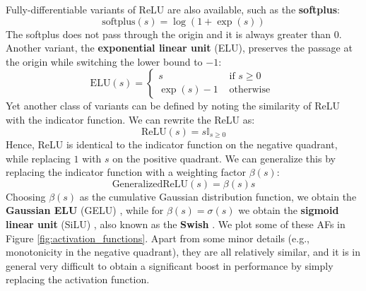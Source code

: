 Fully-differentiable variants of ReLU are also available, such as the \textbf{softplus}:
%
\begin{equation}
\text{softplus}(s)=\log(1+\exp(s))
\label{eq:softplus}
\end{equation}
%
The softplus does not pass through the origin and it is always greater than $0$. Another variant, the \textbf{exponential linear unit} (ELU), preserves the passage at the origin while switching the lower bound to $-1$:
%
\begin{equation}
\text{ELU}(s)=\begin{cases} s & \text{ if } s \ge 0 \\ \exp(s)-1 & \text{ otherwise } \end{cases}
\label{eq:elu}
\end{equation}
%
Yet another class of variants can be defined by noting the similarity of ReLU with the indicator function. We can rewrite the ReLU as:
%
$$
\text{ReLU}(s)=s \mathbb{I}_{s \ge 0}
$$
%
Hence, ReLU is identical to the indicator function on the negative quadrant, while replacing $1$ with $s$ on the positive quadrant. We can generalize this by replacing the indicator function with a weighting factor $\beta(s)$:
%
$$
\text{GeneralizedReLU}(s)=\beta(s)s
$$
%
Choosing $\beta(s)$ as the cumulative Gaussian distribution function, we obtain the \textbf{Gaussian ELU} (GELU) \cite{hendrycks2016gaussian}, while for $\beta(s) = \sigma(s)$ we obtain the \textbf{sigmoid linear unit} (SiLU)  \cite{hendrycks2016gaussian}, also known as the \textbf{Swish} \cite{ramachandran2017searching}. We plot some of these AFs in Figure \ref{fig:activation_functions}. Apart from some minor details (e.g., monotonicity in the negative quadrant), they are all relatively similar, and it is in general very difficult to obtain a significant boost in performance by simply replacing the activation function.

